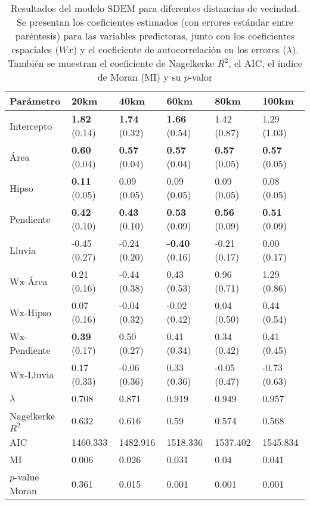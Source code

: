 \documentclass[
  manuscript=article,  
  layout=preprint,  
  year=2023,
  volume=0,
]{format}
\begin{document}
\begin{table}[ht]
\centering
\begin{tabular}{llllll}
  \hline
Parámetro & 20km & 40km & 60km & 80km & 100km \\ 
  \hline
Intercepto & \textbf{1.82} (0.14) & \textbf{1.74} (0.32) & \textbf{1.66} (0.54) & 1.42 (0.87) & 1.29 (1.03) \\ 
  Área & \textbf{0.60} (0.04) & \textbf{0.57} (0.04) & \textbf{0.57} (0.04) & \textbf{0.57} (0.05) & \textbf{0.57} (0.05) \\ 
  Hipso & \textbf{0.11} (0.05) & 0.09 (0.05) & 0.09 (0.05) & 0.09 (0.05) & 0.08 (0.05) \\ 
  Pendiente & \textbf{0.42} (0.10) & \textbf{0.43} (0.10) & \textbf{0.53} (0.09) & \textbf{0.56} (0.09) & \textbf{0.51} (0.09) \\ 
  Lluvia & -0.45 (0.27) & -0.24 (0.20) & \textbf{-0.40} (0.16) & -0.21 (0.17) & 0.00 (0.17) \\ 
  Wx-Área & 0.21 (0.16) & -0.44 (0.38) & 0.43 (0.53) & 0.96 (0.71) & 1.29 (0.86) \\ 
  Wx-Hipso & 0.07 (0.16) & -0.04 (0.32) & -0.02 (0.42) & 0.04 (0.50) & 0.44 (0.54) \\ 
  Wx-Pendiente & \textbf{0.39} (0.17) & 0.50 (0.27) & 0.41 (0.34) & 0.34 (0.42) & 0.41 (0.45) \\ 
  Wx-Lluvia & 0.17 (0.33) & -0.06 (0.36) & 0.33 (0.36) & -0.05 (0.47) & -0.73 (0.63) \\ 
  $\lambda$ & 0.708 & 0.871 & 0.919 & 0.949 & 0.957 \\ 
      \hline
  Nagelkerke $R^2$ & 0.632 & 0.616 & 0.59 & 0.574 & 0.568 \\ 
  AIC & 1460.333 & 1482.916 & 1518.336 & 1537.402 & 1545.834 \\ 
  MI & 0.006 & 0.026 & 0.031 & 0.04 & 0.041 \\ 
  $p$-value Moran & 0.361 & 0.015 & 0.001 & 0.001 & 0.001 \\ 
   \hline
\end{tabular}
\caption{Resultados del modelo SDEM para diferentes distancias de vecindad. Se presentan los coeficientes estimados (con errores estándar entre paréntesis) para las variables predictoras, junto con los coeficientes espaciales ($Wx$) y el coeficiente de autocorrelación en los errores ($\lambda$). También se muestran el coeficiente de Nagelkerke $R^2$, el AIC, el índice de Moran (MI) y su $p$-valor} 
\label{tab:sdem_summary}
\end{table}
\end{document}
